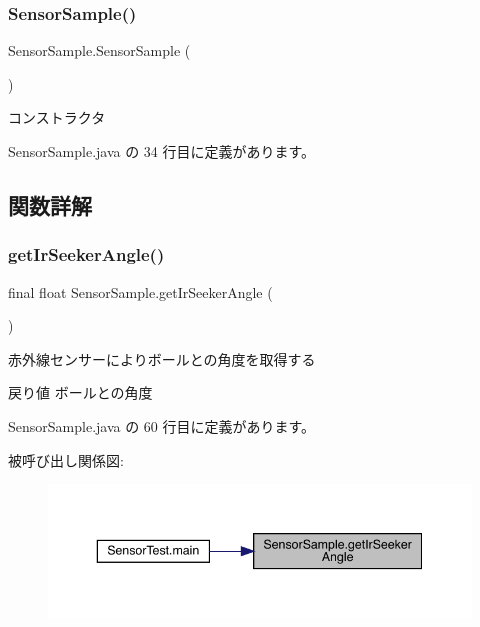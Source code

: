 \subsubsection{\texorpdfstring{SensorSample()}{SensorSample()}}
{\footnotesize\ttfamily Sensor\+Sample.\+Sensor\+Sample (\begin{DoxyParamCaption}{ }\end{DoxyParamCaption})\hspace{0.3cm}{\ttfamily [inline]}}

コンストラクタ 

 Sensor\+Sample.\+java の 34 行目に定義があります。



\subsection{関数詳解}
\mbox{\label{class_sensor_sample_a2340964e246fe0df347e0247329175fe}} 
\subsubsection{\texorpdfstring{getIrSeekerAngle()}{getIrSeekerAngle()}}
{\footnotesize\ttfamily final float Sensor\+Sample.\+get\+Ir\+Seeker\+Angle (\begin{DoxyParamCaption}{ }\end{DoxyParamCaption})\hspace{0.3cm}{\ttfamily [inline]}}

赤外線センサーによりボールとの角度を取得する \begin{DoxyReturn}{戻り値}
ボールとの角度 
\end{DoxyReturn}


 Sensor\+Sample.\+java の 60 行目に定義があります。

被呼び出し関係図\+:
\nopagebreak
\begin{figure}[H]
\begin{center}
\leavevmode
\includegraphics[width=343pt]{d1/d8a/class_sensor_sample_a2340964e246fe0df347e0247329175fe_icgraph}
\end{center}
\end{figure}
\mbox{\label{class_sensor_sample_ac79200df350ed399b1a7ef2ea0285d69}} 
